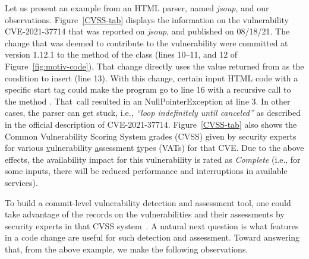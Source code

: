 

Let us present an example from an HTML parser, named {\em jsoup}, and
our observations. Figure~\ref{CVSS-tab} displays the information on
the vulnerability CVE-2021-37714 that was reported on {\em jsoup}, and
published on 08/18/21. The change that was deemed to contribute to the
vulnerability were committed at version 1.12.1 to the method
 of the
 class (lines 10--11, and 12 of
Figure~\ref{fig:motiv-code}). That change directly uses the value
returned from  as the condition to
insert  (line 13). With this change, certain input HTML
code with a specific start tag could make the program go to line 16
with a recursive call to the method . That~call
resulted in an NullPointerException at line 3.
In other cases, the parser can get stuck, i.e., {\em ``loop
  indefinitely until canceled''} as described in the official
description of CVE-2021-37714. Figure~\ref{CVSS-tab} also shows the
Common Vulnerability Scoring System grades (CVSS) given by security
experts for various \underline{v}ulnerability \underline{a}ssessment
\underline{t}ypes (VATs) for that CVE. Due to the above effects, the
availability impact for this vulnerability is rated as {\em Complete}
(i.e., for some inputs, there will be reduced performance and
interruptions in available services).

To build a commit-level vulnerability detection and assessment tool,
one could take advantage of the records on the vulnerabilities and
their assessments by security experts in that CVSS
system~\cite{first-website}. A natural next question is what features
in a code change are useful for such detection and assessment. Toward
answering that, from the above example, we make the following
observations.

